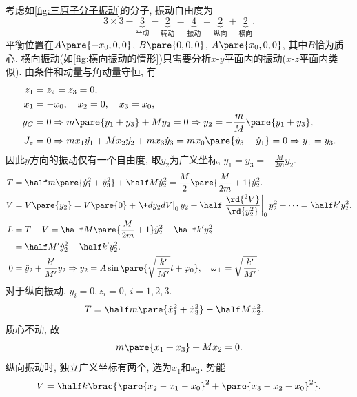 \documentclass[../LectureNotes.tex]{subfiles}
\begin{document}
\begin{sample}
    \begin{ex}[三原子分子振动]
        考虑如\cref{fig:三原子分子振动}的分子, 振动自由度为
        \[ 3\times 3 - \underbrace{3}_{\text{平动}} - \underbrace{2}_{\text{转动}} = \underbrace{4}_{\text{振动}} = \underbrace{2}_{\text{纵向}}+\underbrace{2}_{\text{横向}}. \]
        平衡位置在$A\pare{-x_0,0,0}$, $B\pare{0,0,0}$, $A\pare{x_0,0,0}$, 其中$B$恰为质心. 横向振动(如\cref{fig:横向振动的情形})只需要分析$x$-$y$平面内的振动($x$-$z$平面内类似). 由条件和动量与角动量守恒, 有
        \begin{align*}
            z_1 &= z_2 = z_3 = 0, \\
            x_1 &= -x_0,\quad x_2 = 0,\quad x_3 = x_0, \\
            y_C &= 0 \Rightarrow m\pare{y_1+y_3} + My_2 = 0 \Rightarrow y_2 = -\frac{m}{M}\pare{y_1+y_3}, \\
            J_z &= 0 \Rightarrow mx_1\dot{y_1} + Mx_2\dot{y_2} + mx_3\dot{y}_3 = mx_0 \pare{\dot{y}_3 - \dot{y}_1} = 0 \Rightarrow y_1 = y_3.
        \end{align*}
        因此$y$方向的振动仅有一个自由度, 取$y_2$为广义坐标, $\displaystyle y_1 = y_3 = -\frac{M}{2m}y_2$.
        \begin{align*}
            T &= \half m\pare{\dot{y}_1^2 + \dot{y}_3^2} + \half M\dot{y}_2^2 = \frac{M}{2}\pare{\frac{M}{2m}+1}\dot{y}_2^2. \\
            V &= V\pare{y_2} = V\pare{0} + \left.\+d{y_2}dV\right\vert_{0}y_2 + \half \left.\frac{\rd{^2V}}{\rd{y_2^2}}\right\vert_{0} y_2^2 + \cdots = \half k'y_2^2. \\
            L &= T-V = \half M\pare{\frac{M}{2m}+1}\dot{y}_2^2 - \half k' y_2^2 \\
            &= \half M'\dot{y}_2^2 - \half k' y_2^2. \\
            0 &= \ddot{y}_2 + \frac{k'}{M'}y_2 \Rightarrow y_2 = A\sin\pare{\sqrt{\frac{k'}{M'}}t + \varphi_0},\quad \omega_{\perp} = \sqrt{\frac{k'}{M'}}.
        \end{align*}
        对于纵向振动, $y_i = 0, z_i = 0$, $i = 1,2,3$.
        \begin{align*}
            T &= \half m\pare{\dot{x}_1^2 + \dot{x}_3^2} - \half M\dot{x}_2^2.
        \end{align*}
        质心不动, 故
        \[ m\pare{x_1+x_3} + Mx_2 = 0. \]
        纵向振动时, 独立广义坐标有两个, 选为$x_1$和$x_3$. 势能
        \[ V = \half k\brac{\pare{x_2-x_1-x_0}^2 + \pare{x_3-x_2-x_0}^2}. \]

\end{ex}
\end{sample}
\end{document}
